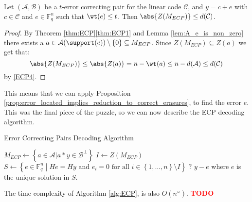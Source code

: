 \begin{lemma}\label{lem:bound_on_ZM_ECP}
  Let $(\mathcal{A}, \mathcal{B})$ be a $t$-error correcting pair for the linear code $\mathcal{C}$, and $y = c + e$ with $c \in \mathcal{C}$ and $e \in \mathbb{F}_q^n$ such that $\wt(e) \leq t$. Then $\abs{Z(M_{ECP})} \leq d(\mathcal{C})$.
\end{lemma}
\begin{proof}
  By Theorem \ref{thm:ECP}\ref{thm:ECP1} and Lemma \ref{lem:A_e_is_non_zero} there exists a $a \in \mathcal{A}(\support(e)) \setminus \left\{0\right\} \subseteq M_{ECP}$. Since $Z(M_{ECP}) \subseteq Z(a)$ we get that:
  \begin{equation*}
    \abs{Z(M_{ECP})} \leq \abs{Z(a)} = n - \wt(a) \leq n - d(\mathcal{A}) \leq d(\mathcal{C})
  \end{equation*}
  by \ref{ECP4}.
\end{proof}

This means that we can apply Proposition \ref{prop:error_located_implies_reduction_to_correct_erasures}, to find the error $e$. This was the final piece of the puzzle, so we can now describe the ECP decoding algorithm.

\begin{algorithm}[H]
\caption{Error Correcting Pairs Decoding Algorithm}\label{alg:ECP}
\begin{algorithmic}

  \State $M_{ECP} \gets \left\{a \in \mathcal{A} | a * y \in \mathcal{B}^{\perp}\right\}$
  \State $I \gets Z(M_{ECP})$
    \State $S \gets \left\{e \in \mathbb{F}_q^n \middle| He = Hy \text{ and }  e_i = 0 \text{ for all } i \in \left\{1, \ldots, n\right\} \setminus I\right\}$
      \State \Return $?$
    \Else
      \State \Return $y - e$ where $e$ is the unique solution in $S$.
    \EndIf
  \EndProcedure
\end{algorithmic}
\end{algorithm}

\begin{remark}
  The time complexity of Algorithm \ref{alg:ECP}, is also $O(n^{\omega})$. \textcolor{red}{\textbf{TODO}}
\end{remark}

